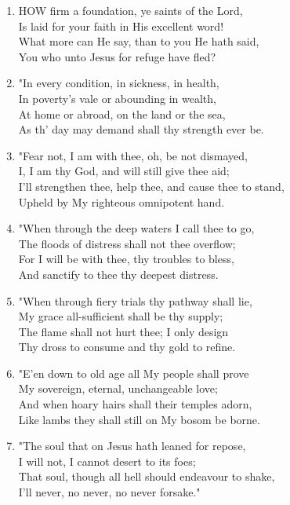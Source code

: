 \documentclass[11pt,a4paper]{article}
\begin{document}
\begin{enumerate}
    \item HOW firm a foundation, ye saints of the Lord, \\
        Is laid for your faith in His excellent word! \\
        What more can He say, than to you He hath said, \\
        You who unto Jesus for refuge have fled?

    \item "In every condition, in sickness, in health, \\
        In poverty's vale or abounding in wealth, \\
        At home or abroad, on the land or the sea, \\
        As th' day may demand shall thy strength ever be.

    \item "Fear not, I am with thee, oh, be not dismayed, \\
        I, I am thy God, and will still give thee aid; \\
        I'll strengthen thee, help thee, and cause thee to stand, \\
        Upheld by My righteous omnipotent hand.

    \item "When through the deep waters I call thee to go, \\
        The floods of distress shall not thee overflow; \\
        For I will be with thee, thy troubles to bless, \\
        And sanctify to thee thy deepest distress.

    \item "When through fiery trials thy pathway shall lie, \\
        My grace all-sufficient shall be thy supply; \\
        The flame shall not hurt thee; I only design \\
        Thy dross to consume and thy gold to refine.

    \item "E'en down to old age all My people shall prove \\
        My sovereign, eternal, unchangeable love; \\
        And when hoary hairs shall their temples adorn, \\
        Like lambs they shall still on My bosom be borne.

    \item "The soul that on Jesus hath leaned for repose, \\
        I will not, I cannot desert to its foes; \\
        That soul, though all hell should endeavour to shake, \\
        I'll never, no never, no never forsake."

\end{enumerate}
\end{document}
